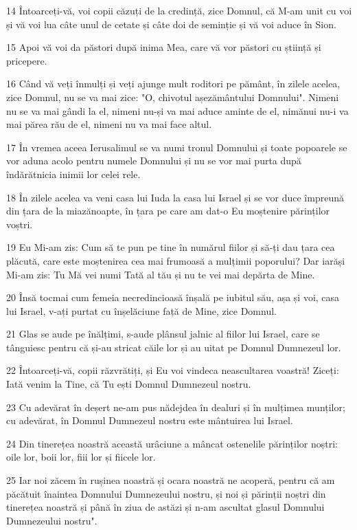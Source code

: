 \par 14 Întoarceți-vă, voi copii căzuți de la credință, zice Domnul, că M-am unit cu voi și vă voi lua câte unul de cetate și câte doi de seminție și vă voi aduce în Sion.
\par 15 Apoi vă voi da păstori după inima Mea, care vă vor păstori cu știință și pricepere.
\par 16 Când vă veți înmulți și veți ajunge mult roditori pe pământ, în zilele acelea, zice Domnul, nu se va mai zice: "O, chivotul așezământului Domnului". Nimeni nu se va mai gândi la el, nimeni nu-și va mai aduce aminte de el, nimănui nu-i va mai părea rău de el, nimeni nu va mai face altul.
\par 17 În vremea aceea Ierusalimul se va numi tronul Domnului și toate popoarele se vor aduna acolo pentru numele Domnului și nu se vor mai purta după îndărătnicia inimii lor celei rele.
\par 18 În zilele acelea va veni casa lui Iuda la casa lui Israel și se vor duce împreună din țara de la miazănoapte, în țara pe care am dat-o Eu moștenire părinților voștri.
\par 19 Eu Mi-am zis: Cum să te pun pe tine în numărul fiilor și să-ți dau țara cea plăcută, care este moștenirea cea mai frumoasă a mulțimii poporului? Dar iarăși Mi-am zis: Tu Mă vei numi Tată al tău și nu te vei mai depărta de Mine.
\par 20 Însă tocmai cum femeia necredincioasă înșală pe iubitul său, așa și voi, casa lui Israel, v-ați purtat cu înșelăciune față de Mine, zice Domnul.
\par 21 Glas se aude pe înălțimi, s-aude plânsul jalnic al fiilor lui Israel, care se tânguiesc pentru că și-au stricat căile lor și au uitat pe Domnul Dumnezeul lor.
\par 22 Întoarceți-vă, copii răzvrătiți, și Eu voi vindeca neascultarea voastră! Ziceți: Iată venim la Tine, că Tu ești Domnul Dumnezeul nostru.
\par 23 Cu adevărat în deșert ne-am pus nădejdea în dealuri și în mulțimea munților; cu adevărat, în Domnul Dumnezeul nostru este mântuirea lui Israel.
\par 24 Din tinerețea noastră această urâciune a mâncat ostenelile părinților noștri: oile lor, boii lor, fiii lor și fiicele lor.
\par 25 Iar noi zăcem în rușinea noastră și ocara noastră ne acoperă, pentru că am păcătuit înaintea Domnului Dumnezeului nostru, și noi și părinții noștri din tinerețea noastră și până în ziua de astăzi și n-am ascultat glasul Domnului Dumnezeului nostru".

